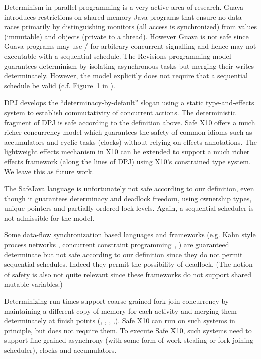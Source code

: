 Determinism in parallel programming is a very active area of research.
Guava \cite{guava} introduces restrictions on shared memory Java
programs that ensure no data-races primarily by distinguishing
monitors (all access is synchronized) from values (immutable) and
objects (private to a thread). However Guava is not safe since Guava
programs may use / for arbitrary concurrent
signalling and hence may not executable with a sequential
schedule. The Revisions programming model \cite{Revisions} guarantees
determinism by isolating asynchronous tasks but merging their writes
determinately. However, the model explicitly does not require that
a sequential schedule be valid (c.f. Figure~1 in \cite{Revisions}).

DPJ develops the ``determinacy-by-default'' slogan using a static
type-and-effects system to establish commutativity of concurrent
actions.  The deterministic fragment of DPJ is safe according to the
definition above. Safe X10 offers a much richer concurrency model
which guarantees the safety of common idioms such as accumulators and
cyclic tasks (clocks) without relying on effects annotations. The
lightweight effects mechanism in X10 can be extended to support a much
richer effects framework (along the lines of DPJ) using X10's
constrained type system.  We leave this as future work.

The SafeJava language \cite{SafeJava} is unfortunately not safe
according to our definition, even though it guarantees determinacy and
deadlock freedom, using ownership types, unique pointers and partially
ordered lock levels. Again, a sequential scheduler is not admissible
for the model.

Some data-flow synchronization based languages and frameworks (e.g.{}
Kahn style process networks \cite{kahn,kahn-mcqueen}, concurrent
constraint programming \cite{ccp}, \cite{SHIM}) are guaranteed
determinate but not safe according to our definition since they do not
permit sequential schedules. Indeed they permit the possibility of
deadlock. (The notion of safety is also not quite relevant since these
frameworks do not support shared mutable variables.)

Determinizing run-times support coarse-grained fork-join concurrency
by maintaining a different copy of memory for each activity and
merging them determinately at finish points (\cite{grace},
\cite{core-det}, \cite{dmp}, \cite{kendo},\cite{determinator}). Safe
X10 can run on such systems in principle, but does not require them.
To execute Safe X10, such systems need to support fine-grained
asynchrony (with some form of work-stealing or fork-joining
scheduler), clocks and accumulators.




